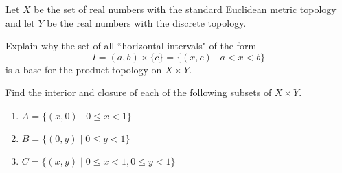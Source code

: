 \item Let $X$ be the set of real numbers with the standard Euclidean metric topology and let $Y$ be the real numbers with the discrete topology. 

	\ba
	\item Explain why the set of all ``horizontal intervals" of the form 
	\[I= (a,b) \times \{c\} = \{(x,c) \mid a < x < b\}\]
	is a base for the product topology on $X \times Y$.
	
	\item Find the interior and closure of each of the following subsets of $X \times Y$.
	
		\begin{enumerate}
		\item $A = \{(x,0) \mid 0 \leq x < 1\}$
		
		\item $B = \{(0,y) \mid 0 \leq y < 1\}$ 
		
		\item $C = \{(x,y) \mid 0 \leq x < 1, 0 \leq y < 1\}$
		
		\end{enumerate}
	
	\ea
	
